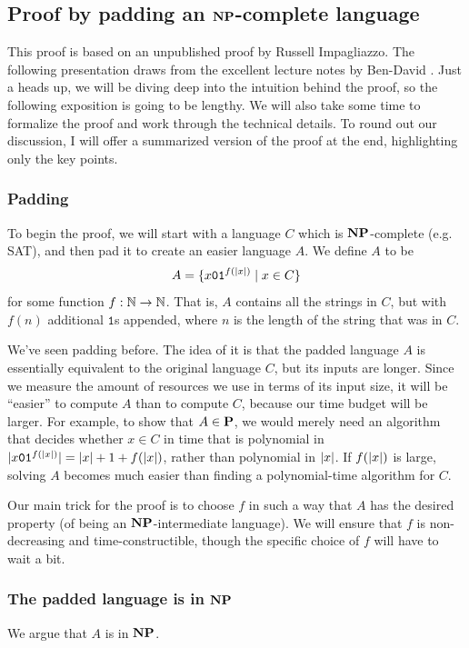 \documentclass[11pt,twoside=off,numbers=noenddot]{scrbook}
\begin{document}
\subsection{Proof by padding an $\textbf{NP}$-complete language}
This proof is based on an unpublished proof by Russell Impagliazzo. The following presentation draws from the excellent lecture notes by Ben-David \cite{ben2021np}. Just a heads up, we will be diving deep into the intuition behind the proof, so the following exposition is going to be lengthy. We will also take some time to formalize the proof and work through the technical details. To round out our discussion, I will offer a summarized version of the proof at the end, highlighting only the key points.

\subsubsection{Padding}
To begin the proof, we will start with a language $C$ which is $\textbf{NP}$-complete (e.g. SAT), and then pad it to create an easier language $A$. We define $A$ to be
\[ A = \{ x\texttt{0}\texttt{1}^{f(| x |)} \mid x \in C \} \]
for some function $f : \mathbb N \to \mathbb N$. That is, $A$ contains all the strings in $C$, but with $f(n)$ additional $\texttt{1}$s appended, where $n$ is the length of the string that was in $C$.

We've seen padding before. The idea of it is that the padded language $A$ is essentially equivalent to the original language $C$, but its inputs are longer. Since we measure the amount of resources we use in terms of its input size, it will be ``easier'' to compute $A$ than to compute $C$, because our time budget will be larger. For example, to show that $A \in \textbf{P}$, we would merely need an algorithm that decides whether $x \in C$ in time that is polynomial in $| x\texttt{0}\texttt{1}^{f(| x |)} | = | x | + 1 + f(| x |)$, rather than polynomial in $| x |$. If $f(| x |)$ is large, solving $A$ becomes much easier than finding a polynomial-time algorithm for $C$.

Our main trick for the proof is to choose $f$ in such a way that $A$ has the desired property (of being an $\textbf{NP}$-intermediate language). We will ensure that $f$ is non-decreasing and time-constructible, though the specific choice of $f$ will have to wait a bit.

\subsubsection{The padded language is in $\textbf{NP}$}
We argue that $A$ is in $\textbf{NP}$.
\end{document}
